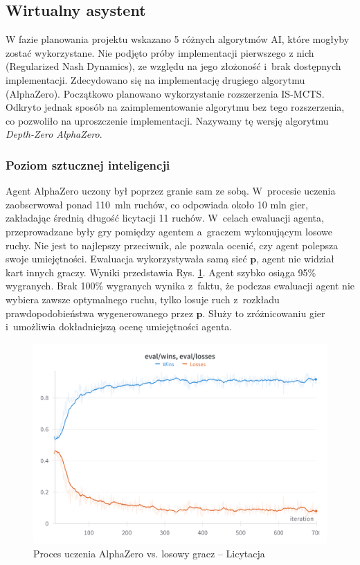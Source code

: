 \FloatBarrier

\subsection{Wirtualny asystent}

W fazie planowania projektu wskazano 5 różnych algorytmów AI, które mogłyby zostać
wykorzystane.
Nie podjęto próby implementacji pierwszego z nich (Regularized Nash Dynamics),
ze względu na jego złożoność i~brak dostępnych implementacji.
Zdecydowano się na implementację drugiego algorytmu (AlphaZero).
Początkowo planowano wykorzystanie rozszerzenia IS-MCTS.
Odkryto jednak sposób na zaimplementowanie algorytmu bez tego rozszerzenia,
co pozwoliło na uproszczenie implementacji. Nazywamy tę wersję algorytmu
\textit{Depth-Zero AlphaZero}.


\subsubsection{Poziom sztucznej inteligencji}
\label{subsubsec:mocai}

Agent AlphaZero uczony był poprzez granie sam ze sobą.
W~procesie uczenia zaobserwował ponad 110~mln ruchów,
co odpowiada około 10 mln gier, zakładając średnią
długość licytacji 11 ruchów.
W~celach ewaluacji agenta, przeprowadzane
były gry pomiędzy agentem a~graczem wykonującym
losowe ruchy.
Nie jest to najlepszy przeciwnik, ale pozwala
ocenić, czy agent polepsza swoje umiejętności.
Ewaluacja wykorzystywała samą sieć $\mathbf{p}$,
agent nie widział kart innych graczy.
Wyniki przedstawia Rys. \ref{fig:bzero-eval}.
Agent szybko osiąga 95\% wygranych.
Brak 100\% wygranych wynika z~faktu, że
podczas ewaluacji agent nie wybiera zawsze optymalnego ruchu,
tylko losuje ruch z~rozkładu prawdopodobieństwa
wygenerowanego przez $\mathbf{p}$.
Służy to zróżnicowaniu gier i~umożliwia
dokładniejszą ocenę umiejętności agenta.


\begin{figure}[!]
  \centering
  \includegraphics[width=\textwidth]{img/wykresy/bzero-eval.png}
  \caption{Proces uczenia AlphaZero vs. losowy gracz -- Licytacja}
  \label{fig:bzero-eval}
\end{figure}

